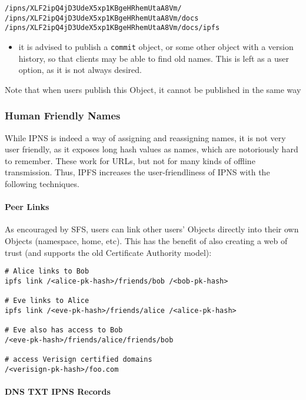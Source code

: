 \documentclass{sig-alternate}
\begin{document}
\begin{verbatim}
/ipns/XLF2ipQ4jD3UdeX5xp1KBgeHRhemUtaA8Vm/
/ipns/XLF2ipQ4jD3UdeX5xp1KBgeHRhemUtaA8Vm/docs
/ipns/XLF2ipQ4jD3UdeX5xp1KBgeHRhemUtaA8Vm/docs/ipfs
\end{verbatim}

\begin{itemize}
  \item it is advised to publish a \texttt{commit} object, or some other object with a version history, so that clients may be able to find old names. This is left as a user option, as it is not always desired.

\end{itemize}

Note that when users publish this Object, it cannot be published in the same way

\subsubsection{Human Friendly Names}

While IPNS is indeed a way of assigning and reassigning names, it is not very user friendly, as it exposes long hash values as names, which are notoriously hard to remember. These work for URLs, but not for many kinds of offline transmission. Thus, IPFS increases the user-friendliness of IPNS with the following techniques.

\paragraph{Peer Links}

As encouraged by SFS, users can link other users' Objects directly into their own Objects (namespace, home, etc). This has the benefit of also creating a web of trust (and supports the old Certificate Authority model):

\begin{verbatim}
# Alice links to Bob
ipfs link /<alice-pk-hash>/friends/bob /<bob-pk-hash>

# Eve links to Alice
ipfs link /<eve-pk-hash>/friends/alice /<alice-pk-hash>

# Eve also has access to Bob
/<eve-pk-hash>/friends/alice/friends/bob

# access Verisign certified domains
/<verisign-pk-hash>/foo.com
\end{verbatim}


\paragraph{DNS TXT IPNS Records}
\end{document}
